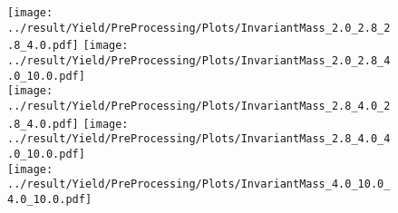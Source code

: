 \begin{figure}[!h]
	\centering
		\texttt{[image: ../result/Yield/PreProcessing/Plots/InvariantMass\_2.0\_2.8\_2.8\_4.0.pdf]}
		\texttt{[image: ../result/Yield/PreProcessing/Plots/InvariantMass\_2.0\_2.8\_4.0\_10.0.pdf]}\\
		\texttt{[image: ../result/Yield/PreProcessing/Plots/InvariantMass\_2.8\_4.0\_2.8\_4.0.pdf]}
		\texttt{[image: ../result/Yield/PreProcessing/Plots/InvariantMass\_2.8\_4.0\_4.0\_10.0.pdf]}\\
		\texttt{[image: ../result/Yield/PreProcessing/Plots/InvariantMass\_4.0\_10.0\_4.0\_10.0.pdf]}

\end{figure}
